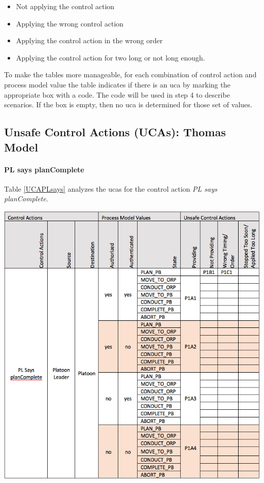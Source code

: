 \documentclass[../../main/main.tex]{subfiles}
\begin{document}
\begin{itemize}
\item Not applying the control action
\item Applying the wrong control action
\item Applying the control action in the wrong order
\item Applying the control action for two long or not long enough.
\end{itemize}

To make the tables more manageable, for each combination of control action and process model value the table indicates if there is an \gls{uca} by marking the appropriate box with a code.  The code will be used in step 4 to describe scenarios.  If the box is empty, then no \gls{uca} is determined for those set of values.

\clearpage
\subsection{Unsafe Control Actions (UCAs): Thomas Model}


\paragraph*{PL says planComplete}
Table \ref{UCAPLsays} analyzes the \glspl{uca} for the control action \textit{PL says planComplete}.

\begin{table}[ht!]
\begin{center}
\includegraphics[width=\linewidth]{../figures/UCAPLsays}
\caption{Unsafe control actions \glspl{uca} for control action "PL says planComplete."}
\label{UCAPLsays}
\end{center}
\end{table}
\end{document}
